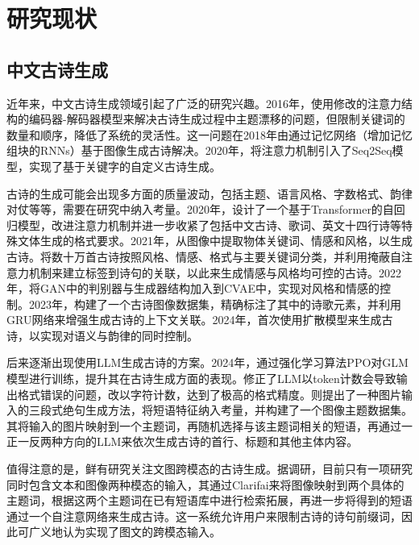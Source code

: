 \section{研究现状}

\subsection{中文古诗生成}
近年来，中文古诗生成领域引起了广泛的研究兴趣。2016年，\cite{wangChinesePoetryGeneration2016}使用修改的注意力结构的编码器-解码器模型来解决古诗生成过程中主题漂移的问题，但限制关键词的数量和顺序，降低了系统的灵活性。这一问题在2018年由\cite{xuHowImagesInspire2018}通过记忆网络（增加记忆组块的RNNs）基于图像生成古诗解决。2020年，\cite{WangJiYuSeq2SeqMoXingDeZiDingYiGuShiShengCheng2020}将注意力机制引入了Seq2Seq模型，实现了基于关键字的自定义古诗生成。

古诗的生成可能会出现多方面的质量波动，包括主题、语言风格、字数格式、韵律对仗等等，需要在研究中纳入考量。2020年，\cite{liRigidFormatsControlled2020}设计了一个基于Transformer的自回归模型，改进注意力机制并进一步收紧了包括中文古诗、歌词、英文十四行诗等特殊文体生成的格式要求。2021年，\cite{wuGenerateClassicalChinese2021}从图像中提取物体关键词、情感和风格，以生成古诗。\cite{shaoSentimentStyleControllable2021}将数十万首古诗按照风格、情感、格式与主要关键词分类，并利用掩蔽自注意力机制来建立标签到诗句的关联，以此来生成情感与风格均可控的古诗。2022年，\cite{LiFengGeHeQingGanKongZhiDeZhongGuoGuShiShengCheng2022}将GAN中的判别器与生成器结构加入到CVAE中，实现对风格和情感的控制。2023年，\cite{renGeneratingChinesePoetry2023}构建了一个古诗图像数据集，精确标注了其中的诗歌元素，并利用GRU网络来增强生成古诗的上下文关联。2024年，\cite{huPoetryDiffusionJointSemantic2024}首次使用扩散模型来生成古诗，以实现对语义与韵律的同时控制。

后来逐渐出现使用LLM生成古诗的方案。2024年，\cite{CengShengChengShiYuYanMoXingZaiGuShiShengChengZhongDeYouHua2024}通过强化学习算法PPO对GLM模型进行训练，提升其在古诗生成方面的表现。\cite{yuCharPoetChineseClassical2024}修正了LLM以token计数会导致输出格式错误的问题，改以字符计数，达到了极高的格式精度。\cite{liuMultiModalChinesePoetry2018}则提出了一种图片输入的三段式绝句生成方法，将短语特征纳入考量，并构建了一个图像主题数据集。其将输入的图片映射到一个主题词，再随机选择与该主题词相关的短语，再通过一正一反两种方向的LLM来依次生成古诗的首行、标题和其他主体内容。

值得注意的是，鲜有研究关注文图跨模态的古诗生成。据调研，目前只有\cite{liuDeepPoetryChinese2020}一项研究同时包含文本和图像两种模态的输入，其通过Clarifai来将图像映射到两个具体的主题词，根据这两个主题词在已有短语库中进行检索拓展，再进一步将得到的短语通过一个自注意网络来生成古诗。这一系统允许用户来限制古诗的诗句前缀词，因此可广义地认为实现了图文的跨模态输入。

